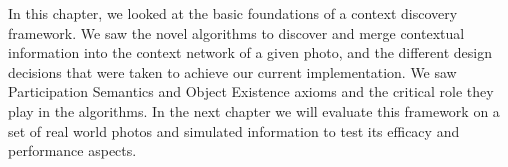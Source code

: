 In this chapter, we looked at the basic foundations of a context discovery framework. We saw the novel algorithms to discover and merge contextual information into the context network of a given photo, and the different design decisions that were taken to achieve our current implementation. We saw Participation Semantics and Object Existence axioms and the critical role they play in the algorithms. In the next chapter we will evaluate this framework on a set of real world photos and simulated information to test its efficacy and performance aspects.